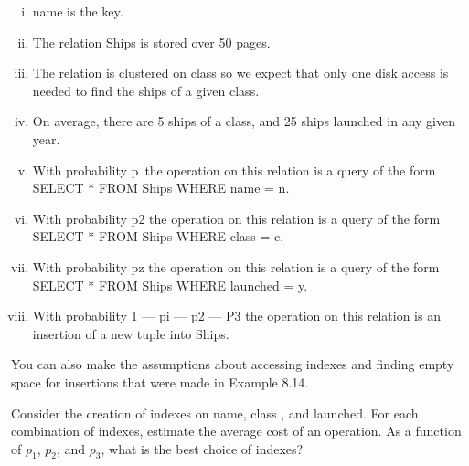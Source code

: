 \documentclass[12pt]{article}
\begin{document}
\begin{enumerate}[1.]
    \begin{enumerate}[i.]
    \item name is the key.
    \item The relation Ships is stored over 50 pages.
    \item The relation is clustered on class so we expect that only one disk access is needed to find the ships of a given class.
    \item On average, there are 5 ships of a class, and 25 ships launched in any given year.
    \item With probability p\ the operation on this relation is a query of the form SELECT * FROM Ships WHERE name = n.
    \item With probability p2 the operation on this relation is a query of the form SELECT * FROM Ships WHERE class = c.
    \item With probability pz the operation on this relation is a query of the form SELECT * FROM Ships WHERE launched = y.
    \item With probability 1 — pi — p2 — P3 the operation on this relation is an
    insertion of a new tuple into Ships.
    \end{enumerate}

    \bigskip

    You can also make the assumptions about accessing indexes and finding empty space for insertions that were made in Example 8.14.

    \bigskip

    Consider the creation of indexes on name, class , and launched. For each
    combination of indexes, estimate the average cost of an operation. As a function
    of $p_1$, $p_2$, and $p_3$, what is the best choice of indexes?

\end{enumerate}
\end{document}
